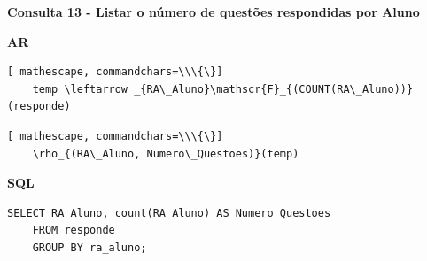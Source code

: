 \documentclass[12pt,a4paper]{article}
\begin{document}
\vspace{0.5cm}
\begin{center}
    \textbf{Consulta 13 - Listar o número de questões respondidas por Aluno}
\end{center}
\begin{center}
    \textbf{AR}
\end{center}

\begin{Verbatim}[ mathescape, commandchars=\\\{\}]
    temp \leftarrow _{RA\_Aluno}\mathscr{F}_{(COUNT(RA\_Aluno))}(responde)
\end{Verbatim}
\begin{Verbatim}[ mathescape, commandchars=\\\{\}]
    \rho_{(RA\_Aluno, Numero\_Questoes)}(temp)
\end{Verbatim}

\begin{center}
    \textbf{SQL}
\end{center}
\begin{Verbatim}[commandchars=\\\{\}]
    SELECT RA_Aluno, count(RA_Aluno) AS Numero_Questoes 
    FROM responde 
    GROUP BY ra_aluno;
\end{Verbatim}
\end{document}

